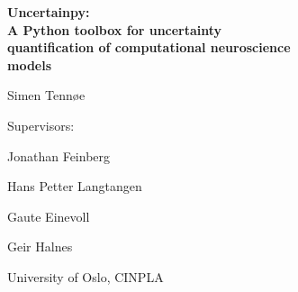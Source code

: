 \documentclass[presentation]{beamer}
\begin{document}
\begin{frame}
\begin{center}
    \textbf{\color{myred}\Large Uncertainpy: \\
    \vspace{1mm} A Python toolbox for uncertainty\\
    \vspace{1mm} quantification of computational neuroscience \\
    \vspace{1mm}  models}
\end{center}


     \large \vspace{8mm} Simen Tennøe

      \vspace{6mm}
      \footnotesize Supervisors:

      \vspace{1mm}
      Jonathan Feinberg

      Hans Petter Langtangen

      Gaute Einevoll

      Geir Halnes

      \vspace{5mm}
    \small University of Oslo, CINPLA


\end{frame}
\end{document}
